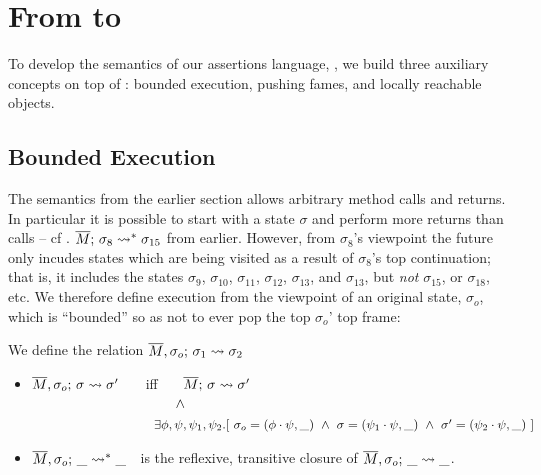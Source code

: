 \section{From \LangOO to \AssertLang}

{To develop the semantics of our assertions language, \AssertLang, we   build three auxiliary concepts on  top of  \LangOO: bounded execution, pushing fames, and locally  reachable objects.}


\subsection{Bounded Execution}
\label{sect:bounded}

{The semantics from the earlier section allows arbitrary method calls and returns. %
In particular it is possible to start with a state $\sigma$ and perform more returns than calls --
cf . $\leadstoOrigStar  {\Mtwo} {\sigma_{8}}   {\sigma_{15}}$ from earlier.
 {However,  from $\sigma_8$'s viewpoint the future only incudes states which are being visited as a result of  $\sigma_8$'s top continuation}; that is, it includes the states $\sigma_9$, $\sigma_{10}$, $\sigma_{11}$, $\sigma_{12}$, $\sigma_{13}$, and $\sigma_{13}$, but \emph{not} $\sigma_{15}$, or $\sigma_{18}$, etc.
We therefore define  execution from the viewpoint of an original state, $\sigma_o$, which  is ``bounded'' so as not to ever pop the top  $\sigma_o$' top frame:}


 
\begin{definition}
\label{def:shallow:term}
We define the relation  $\leadstoBounded {\Mtwo} {\sigma_1} {\sigma_o} {\sigma_2}$ 

\begin{itemize}
\item
 $\leadstoBounded {\Mtwo} {\sigma} {\sigma_o}  {\sigma'}$ \ \ \ iff \ \ \  $\leadstoOrig {\Mtwo} {\sigma} {\sigma'}$\\
$\strut  \hspace{3.6cm} \wedge $\\
$\strut  \hspace{3.1cm}\ \    \exists \phi,\psi, \psi_1, \psi_2.[ \ \sigma_o = (\phi\cdot\psi,\_) \ \wedge \ \sigma = (\psi_1\cdot \psi, \_)
\ \wedge\ \sigma' = (\psi_2\cdot \psi, \_)\ ] $ 
\item
 $\leadstoBoundedStar {\Mtwo}  {\_}  {\sigma_o} {\_}$\ \  is the reflexive, transitive closure of $\leadstoBounded {\Mtwo}  {\_}  {\sigma_o} {\_}$.
\end{itemize}
\end{definition}
 
